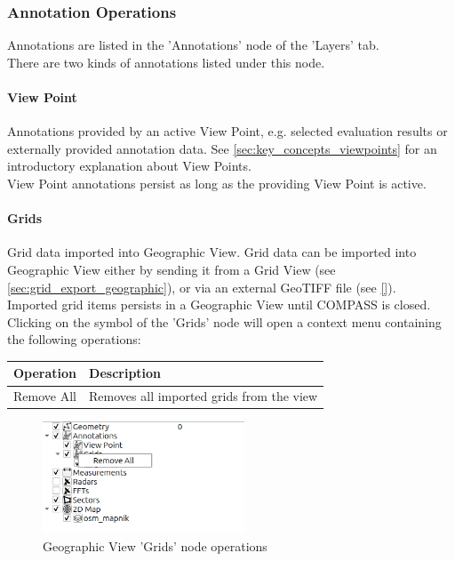 \subsubsection{Annotation Operations}
\label{sec:geo_annotation_ops}  

Annotations are listed in the 'Annotations' node of the 'Layers' tab. \\

There are two kinds of annotations listed under this node.

\paragraph*{View Point} Annotations provided by an active View Point, e.g. selected evaluation results or externally provided annotation data.
See \ref{sec:key_concepts_viewpoints} for an introductory explanation about View Points. \\

View Point annotations persist as long as the providing View Point is active.

\paragraph*{Grids} Grid data imported into Geographic View. Grid data can be imported into 
Geographic View either by sending it from a Grid View (see \ref{sec:grid_export_geographic}), or via an external GeoTIFF file (see \ref{}). \\

Imported grid items persists in a Geographic View until COMPASS is closed. \\

Clicking on the symbol of the 'Grids' node will open a context menu containing the following operations:

\begin{table}[H]
    \center
    \begin{tabular}{ | l | l |}
      \hline
      \textbf{Operation} & \textbf{Description} \\ \hline
      Remove All & Removes all imported grids from the view \\ \hline
    \end{tabular}
\end{table}

\begin{figure}[H]
    \center
    \hspace*{-2.5cm}
    \includegraphics[width=6cm,frame]{figures/geoview_gridops_grids.png}
  \caption{Geographic View 'Grids' node operations}
\end{figure}

